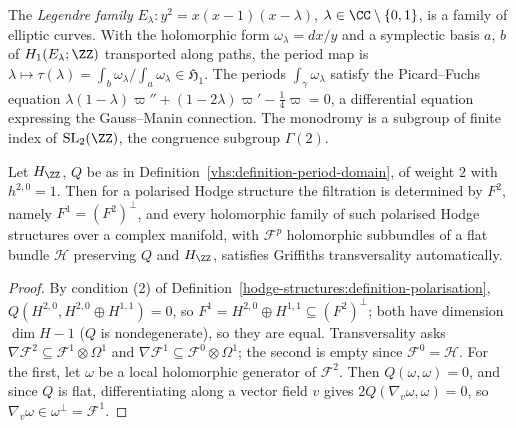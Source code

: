 \begin{example}\label{vhs:example-legendre}
The \emph{Legendre family} $E_\lambda \colon y^2 = x(x - 1)(x - \lambda)$, $\lambda \in \CC \setminus \{0, 1\}$, is a family of elliptic curves. With the holomorphic form $\omega_\lambda = dx/y$
and a symplectic basis $a$, $b$ of $H_1(E_\lambda; \ZZ)$ transported along paths, the period map is $\lambda \mapsto \tau(\lambda) = \int_b\omega_\lambda/\int_a\omega_\lambda \in \mathfrak{H}_1$. The periods
$\int_\gamma\omega_\lambda$ satisfy the Picard--Fuchs equation $\lambda(1 - \lambda)\varpi'' + (1 - 2\lambda)\varpi' - \frac14\varpi = 0$, a differential equation expressing the Gauss--Manin connection.
The monodromy is a subgroup of finite index of $\mathrm{SL}_2(\ZZ)$, the congruence subgroup $\Gamma(2)$.
\end{example}

\begin{proposition}\label{vhs:proposition-k3-transversality}
Let $H_\ZZ$, $Q$ be as in Definition~\ref{vhs:definition-period-domain}, of weight $2$ with $h^{2,0} = 1$. Then for a polarised Hodge structure the filtration is determined by $F^2$, namely
$F^1 = (F^2)^\perp$, and every holomorphic family of such polarised Hodge structures over a complex manifold, with $\mathcal{F}^p$ holomorphic subbundles of a flat bundle $\mathcal{H}$ preserving $Q$ and
$H_\ZZ$, satisfies Griffiths transversality automatically.
\end{proposition}

\begin{proof}
By condition (2) of Definition~\ref{hodge-structures:definition-polarisation}, $Q(H^{2,0}, H^{2,0} \oplus H^{1,1}) = 0$, so $F^1 = H^{2,0} \oplus H^{1,1} \subseteq (F^2)^\perp$; both have dimension
$\dim H - 1$ ($Q$ is nondegenerate), so they are equal. Transversality asks $\nabla\mathcal{F}^2 \subseteq \mathcal{F}^1 \otimes \Omega^1$ and $\nabla\mathcal{F}^1 \subseteq \mathcal{F}^0 \otimes \Omega^1$; the second
is empty since $\mathcal{F}^0 = \mathcal{H}$. For the first, let $\omega$ be a local holomorphic generator of $\mathcal{F}^2$. Then $Q(\omega, \omega) = 0$, and since $Q$ is flat, differentiating along a
vector field $v$ gives $2Q(\nabla_v\omega, \omega) = 0$, so $\nabla_v\omega \in \omega^\perp = \mathcal{F}^1$.
\end{proof}

